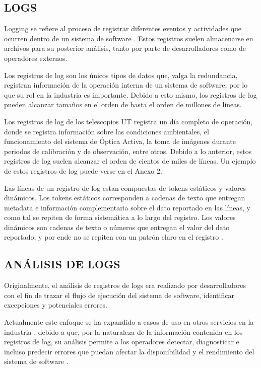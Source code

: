 \subsection{LOGS}
Logging se refiere al proceso de registrar diferentes eventos y actividades que ocurren dentro de un sistema de software \cite{jayathilake2011mind}. Estos registros suelen almacenarse en archivos para su posterior análisis, tanto por parte de desarrolladores como de operadores externos.

Los registros de log son los únicos tipos de datos que, valga la redundancia, registran información de la operación interna de un sistema de software, por lo que su rol en la industria es importante. Debido a esto mismo, los registros de log pueden alcanzar tamaños en el orden de hasta el orden de millones de líneas\cite{ma2023automatic}.

Los registros de log de los telescopios UT registra un día completo de operación, donde se registra información sobre las condiciones ambientales, el funcionamiento del sistema de Óptica Activa, la toma de imágenes durante periodos de calibración y de observación, entre otros. Debido a lo anterior, estos registros de log suelen alcanzar el orden de cientos de miles de líneas. Un ejemplo de estos registros de log puede verse en el Anexo 2.

Las líneas de un registro de log estan compuestas de tokens estáticos y valores dinámicos. Los tokens estáticos corresponden a cadenas de texto que entregan metadata e información complementaria sobre el dato reportado en las líneas, y como tal se repiten de forma sistemática a lo largo del registro. Los valores dinámicos son cadenas de texto o números que entregan el valor del dato reportado, y por ende no se repiten con un patrón claro en el registro \cite{ma2023automatic}. 

\subsection{ANÁLISIS DE LOGS}
Originalmente, el análisis de registros de logs era realizado por desarrolladores con el fin de trazar el flujo de ejecución del sistema de software, identificar excepciones y potenciales errores. \cite{jayathilake2011mind}

Actualmente este enfoque se ha expandido a casos de uso en otros servicios en la industria \cite{ma2023automatic}, debido a que, por la naturaleza de la información contenida en los registros de log, su análisis permite a los operadores detectar, diagnosticar e incluso predecir errores que puedan afectar la disponibilidad y el rendimiento del sistema de software \cite{jayathilake2011mind}.

